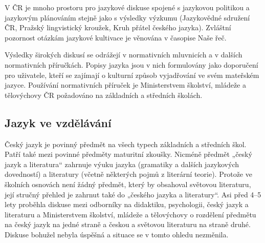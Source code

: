 \begin{multicols}{2}
V ČR je mnoho prostoru pro jazykové diskuse spojené s jazykovou politikou a jazykovým plánováním stejně jako s výsledky výzkumu (Jazykovědné sdružení ČR, Pražský lingvistický kroužek, Kruh přátel českého jazyka). Zvláštní pozornost otázkám jazykové kultivace je věnována v časopise Naše řeč.
 
Výsledky širokých diskusí se odrážejí v normativních mluvnicích a v dalších normativních příručkách. Popisy jazyka jsou v nich formulovány jako doporučení pro uživatele, kteří se zajímají o kulturní způsob vyjadřování ve svém mateřském jazyce. Používání normativních příruček je Ministerstvem školství, mládeže a tělovýchovy ČR požadováno na základních a středních školách.

  
\subsection{Jazyk ve vzdělávání}

Český jazyk je povinný předmět na všech typech základních a středních škol. Patří také mezi povinné předměty maturitní zkoušky. Nicméně předmět „český jazyk a literatura“ zahrnuje výuku jazyka (gramatiky a dalších jazykových dovedností) a literatury (včetně některých pojmů z literární teorie). Protože ve školních osnovách není žádný předmět, který by obsahoval světovou literaturu, její stručný přehled je zahrnut také do „českého jazyka a literatury“. Asi před 4–5 lety proběhla diskuse mezi odborníky na didaktiku, psychologii, český jazyk a literaturu a Ministerstvem školství, mládeže a tělovýchovy o rozdělení předmětu na český jazyk na jedné straně a českou a světovou literaturu na straně druhé. Diskuse bohužel nebyla úspěšná a situace se v tomto ohledu nezměnila.


\end{multicols}
